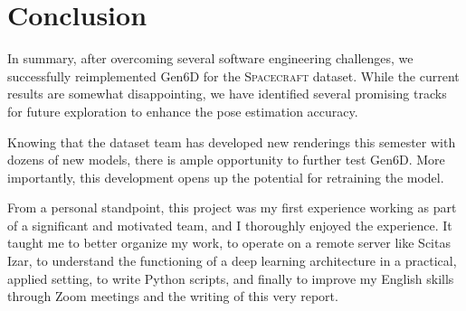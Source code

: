 
\chapter{Conclusion}\label{chapter:conclusion}

In summary, after overcoming several software engineering challenges, we successfully reimplemented Gen6D for the \textsc{Spacecraft} dataset. While the current results are somewhat disappointing, we have identified several promising tracks for future exploration to enhance the pose estimation accuracy.

\bigskip

Knowing that the dataset team has developed new renderings this semester with dozens of new models, there is ample opportunity to further test Gen6D. More importantly, this development opens up the potential for retraining the model. 

\bigskip

From a personal standpoint, this project was my first experience working as part of a significant and motivated team, and I thoroughly enjoyed the experience. It taught me to better organize my work, to operate on a remote server like Scitas Izar, to understand the functioning of a deep learning architecture in a practical, applied setting, to write Python scripts, and finally to improve my English skills through Zoom meetings and the writing of this very report.